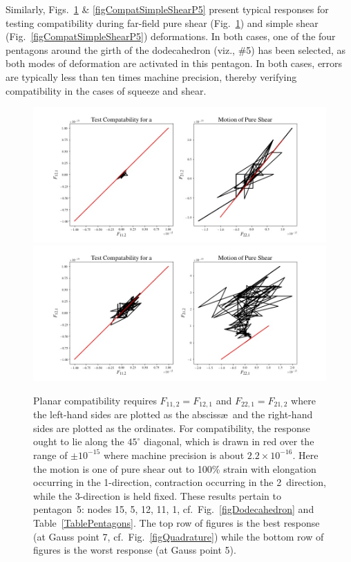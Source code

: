 Similarly, Figs.~\ref{figCompatPureShearP5} \& \ref{figCompatSimpleShearP5} present typical responses for testing compatibility during far-field pure shear (Fig.~\ref{figCompatPureShearP5}) and simple shear (Fig.~\ref{figCompatSimpleShearP5}) deformations.  In both cases, one of the four pentagons around the girth of the dodecahedron (viz., \#5) has been selected, as both modes of deformation are activated in this pentagon.  In both cases, errors are typically less than ten times machine precision, thereby verifying compatibility in the cases of squeeze and shear.

\begin{figure}
	\centering
	\includegraphics[width=\textwidth]{figures/compatibilityPureShearP5G7.jpg}
	\includegraphics[width=\textwidth]{figures/compatibilityPureShearP5G5.jpg}
	\caption{Planar compatibility requires $F_{11,2} = F_{12,1}$ and $F_{22,1} = F_{21,2}$ where the left-hand sides are plotted as the absciss\ae\ and the right-hand sides are plotted as the ordinates.  For compatibility, the response ought to lie along the $45^{\circ}$ diagonal, which is drawn in red over the range of $\pm 10^{-15}$ where machine precision is about $2.2 \times 10^{-16}$.  Here the motion is one of pure shear out to 100\% strain with elongation occurring in the 1-direction, contraction occurring in the 2~direction, while the 3-direction is held fixed.  These results pertain to pentagon~5: nodes 15, 5, 12, 11, 1, cf.\ Fig.~\ref{figDodecahedron} and Table~\ref{TablePentagons}.  The top row of figures is the best response (at Gauss point 7, cf.\ Fig.~\ref{figQuadrature}) while the bottom row of figures is the worst response (at Gauss point 5).}
	\label{figCompatPureShearP5}
\end{figure}

